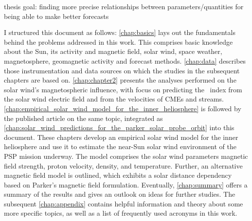 

thesis goal: finding more precise relationships between parameters/quantities for being able to make better forecasts\\


\bigskip

I structured this document as follows: \autoref{chap:basics} lays out the fundamentals behind the problems addressed in this work. This comprises basic knowledge about the Sun, its activity and magnetic field, solar wind, space weather, magnetosphere, geomagnetic activity and forecast methods. \autoref{chap:data} describes those instrumentation and data sources on which the studies in the subsequent chapters are based on. \autoref{chap:chapter2} presents the analyses performed on the solar wind's magnetospheric influence, with focus on predicting the \Kp~index from the solar wind electric field and from the velocities of CMEs and streams. \autoref{chap:empirical_solar_wind_model_for_the_inner_heliosphere} is followed by the published article on the same topic, integrated as \autoref{chap:solar_wind_predictions_for_the_parker_solar_probe_orbit} into this document. These chapters develop an empirical solar wind model for the inner heliosphere and use it to estimate the near-Sun solar wind environment of the PSP mission underway. The model comprises the solar wind parameters magnetic field strength, proton velocity, density, and temperature. Further, an alternative magnetic field model is outlined, which exhibits a solar distance dependency based on Parker's magnetic field formulation. Eventually, \autoref{chap:summary} offers a summary of the results and gives an outlook on ideas for further studies. The subsequent \autoref{chap:appendix} contains helpful information and theory about some more specific topics, as well as a list of frequently used acronyms in this work.


